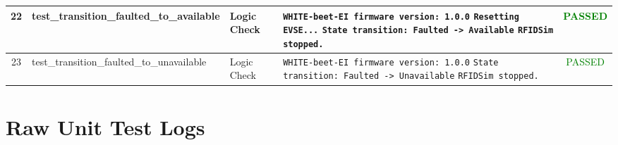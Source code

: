 \documentclass[10pt, a4paper, landscape]{article}
\begin{document}
\begin{longtable}{|c|p{6cm}|p{2.5cm}|p{8cm}|c|}
\hline
22 & test\_transition\_faulted\_to\_available & Logic Check & \texttt{\scriptsize WHITE-beet-EI firmware version: 1.0.0} \newline \texttt{\scriptsize Resetting EVSE...} \newline \texttt{\scriptsize State transition: Faulted -> Available} \newline \texttt{\scriptsize RFIDSim stopped.} & \textcolor{green}{PASSED} \\
\hline
23 & test\_transition\_faulted\_to\_unavailable & Logic Check & \texttt{\scriptsize WHITE-beet-EI firmware version: 1.0.0} \newline \texttt{\scriptsize State transition: Faulted -> Unavailable} \newline \texttt{\scriptsize RFIDSim stopped.} & \textcolor{green}{PASSED} \\
\hline

\end{longtable}
\newpage
\appendix
\section{Raw Unit Test Logs}
\label{sec:raw_logs}
\normalsize

\end{document}
